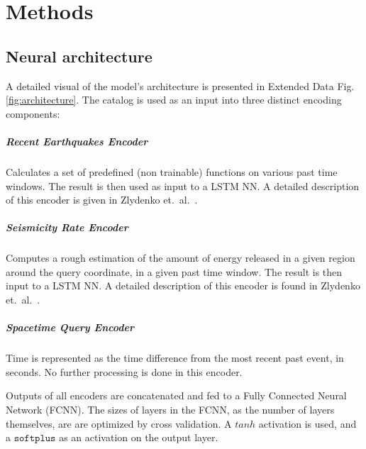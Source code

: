 \documentclass[pdflatex]{sn-jnl}
\begin{document}
\newpage
\unnumbered

\unnumbered
\section{Methods}
\subsection{Neural architecture}
A detailed visual of the model's architecture is presented in Extended Data Fig. \ref{fig:architecture}. The catalog is used as an input into three distinct encoding components:
\subparagraph{\textbf{Recent Earthquakes Encoder}} Calculates a set of predefined (non trainable) functions on various past time windows. The result is then used as input to a LSTM NN. A detailed description of this encoder is given in Zlydenko et.~al.~\cite{zlydenko_neural_2023}. 

\subparagraph{\textbf{Seismicity Rate Encoder}} Computes a rough estimation of the amount of energy released in a given region around the query coordinate, in a given past time window. The result is then input to a LSTM NN. A detailed description of this encoder is found in Zlydenko et.~al.~\cite{zlydenko_neural_2023}.

\subparagraph{\textbf{Spacetime Query Encoder}} Time is represented as the time difference from the most recent past event, in seconds. No further processing is done in this encoder.

Outputs of all encoders are concatenated and fed to a Fully Connected Neural Network (FCNN). The sizes of layers in the FCNN, as the number of layers themselves, are are optimized by cross validation. A $tanh$ activation is used, and a $\texttt{softplus}$ as an activation on the output layer. 
\end{document}
